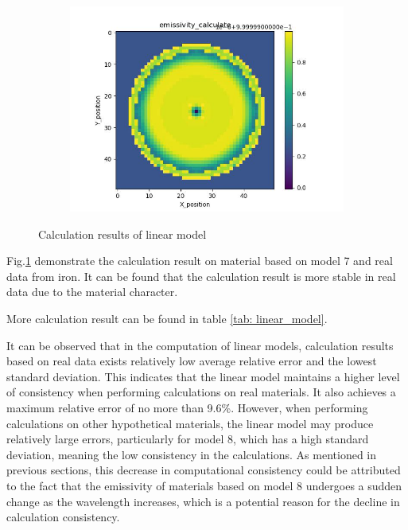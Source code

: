 \begin{figure}[htbp]
\begin{minipage}{\textwidth}
\begin{subfigure}{0.49\textwidth}
            \includegraphics[width=\textwidth]{figures/raw_data/5/linear/emi_cal.jpg}
        \end{subfigure}
    \end{minipage}
    \caption{Calculation results of linear model}
    \label{fig: linear_model}
\end{figure}


Fig.\ref{fig: linear_model} demonstrate the calculation result on material based on 
model 7 and real data from iron. It can be found that the calculation result is more
stable in real data due to the material character. 

More calculation result can be found in table \ref{tab: linear_model}. 


It can be observed that in the computation of linear models, 
calculation results based on real data exists relatively low average relative error and the lowest 
standard deviation. This indicates that the linear model maintains a higher 
level of consistency when performing calculations on real materials. It also 
achieves a maximum relative error of no more than 9.6\%. However, when 
performing calculations on other hypothetical materials, the linear model may 
produce relatively large errors, particularly for model 8, which has a high standard 
deviation, meaning the low consistency in the calculations. As mentioned 
in previous sections, this decrease in computational consistency could be attributed to the 
fact that the emissivity of materials based on model 8 undergoes a sudden change 
as the wavelength increases, which is a potential reason for the decline in 
calculation consistency.

